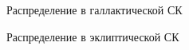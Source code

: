 \documentclass[12pt,aspectratio=43]{beamer}
\begin{document}
\begin{frame}[<alignment>]
\begin{figure}[h!]
\caption{Распределение в галлактической СК}
\label{img:hiptgasl}
\end{figure}
\end{frame}	

\begin{frame}[<alignment>]
\begin{figure}[h!]
\caption{Распределение в эклиптической СК}
\label{img:hiptgaslo}
\end{figure}
\end{frame}	
\end{document}
